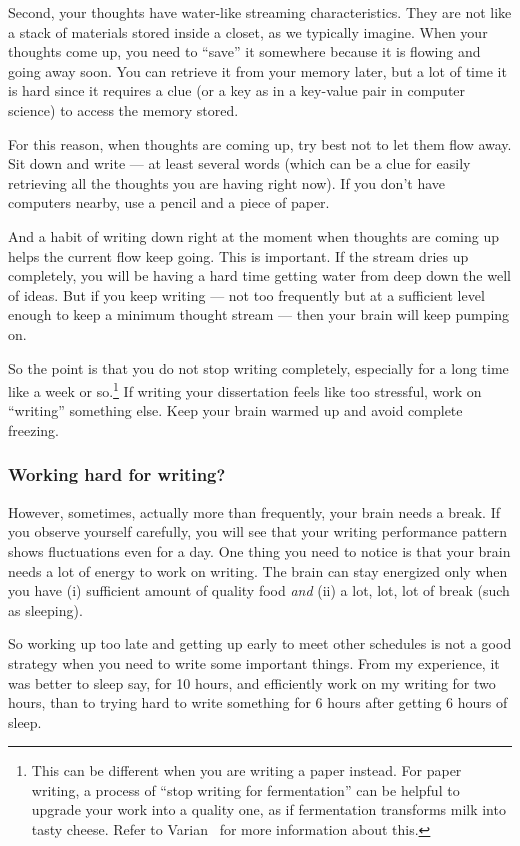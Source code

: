 \documentclass[11pt]{article}
\begin{document}
Second, your thoughts have water-like streaming characteristics.  They are not
like a stack of materials stored inside a closet, as we typically imagine.
When your thoughts come up, you need to ``save'' it somewhere because it is
flowing and going away soon. You can retrieve it from your memory later, but a
lot of time it is hard since it requires a clue (or a key as in a key-value
pair in computer science) to access the memory stored.

For this reason, when thoughts are coming up, try best not to let them flow
away. Sit down and write --- at least several words (which can be a clue for
easily retrieving all the thoughts you are having right now). If you don't
have computers nearby, use a pencil and a piece of paper. 

And a habit of writing down right at the moment when thoughts are coming up
helps the current flow keep going. This is important. If the stream dries up
completely, you will be having a hard time getting water from deep down the
well of ideas.  But if you keep writing --- not too frequently but at a
sufficient level enough to keep a minimum thought stream --- then your brain
will keep pumping on.

So the point is that you do not stop writing completely, especially for a long
time like a week or so.\footnote{This can be different when you are writing a
paper instead. For paper writing, a process of ``stop writing for
fermentation'' can be helpful to upgrade your work into a quality one, as if
fermentation transforms milk into tasty cheese. Refer to
Varian~\cite{varian-building-model} for more information about this.} If
writing your dissertation feels like too stressful, work on ``writing''
something else. Keep your brain warmed up and avoid complete freezing. 

\subsubsection{Working hard for writing?}

However, sometimes, actually more than frequently, your brain needs a break.
If you observe yourself carefully, you will see that your writing performance
pattern shows fluctuations even for a day. One thing you need to notice is
that your brain needs a lot of energy to work on writing. The brain can stay
energized only when you have (i) sufficient amount of quality food \emph{and}
(ii) a lot, lot, lot of break (such as sleeping). 

So working up too late and getting up early to meet other schedules is not a
good strategy when you need to write some important things. From my
experience, it was better to sleep say, for 10 hours, and efficiently work on
my writing for two hours, than to trying hard to write something for 6 hours
after getting 6 hours of sleep. 
\end{document}
